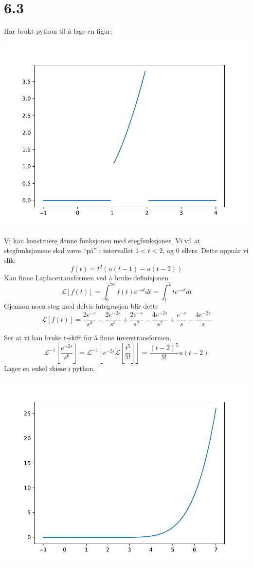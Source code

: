 \documentclass[11pt, a4paper, norsk]{NTNUoving}
\begin{document}
\section*{6.3}
\begin{oppgave}[8]
  Har brukt python til å lage en figur:

  \includegraphics[scale=0.5]{6.2.8.pdf}

  Vi kan konstruere denne funksjonen med stegfunksjoner. Vi vil at stegfunksjonene skal være ``på'' i intervallet $1<t<2$, og 0 ellers. Dette oppnår vi slik:
  \[
    f(t)=t^{2}(u(t-1)-u(t-2))
  \]
  Kan finne Laplacetransformen ved å bruke definisjonen
  \[
    \mathscr{L}[f(t)]=\int_{0}^{\infty}f(t)e^{-st}dt= \int_{1}^{2}te^{-st}dt
  \]
  Gjennon noen steg med delvis integrasjon blir dette
  \[
    \mathscr{L}[f(t)]=\frac{2e^{-s}}{s^{3}}-\frac{2e^{-2s}}{s^{3}}
    +\frac{2e^{-s}}{s^{2}}-\frac{4e^{-2s}}{s^{2}}
    +\frac{e^{-s}}{s}-\frac{4e^{-2s}}{s}
  \]
\end{oppgave}
\begin{oppgave}[15]
  Ser at vi kan bruke t-skift for å finne inverstransformen.
  \[
    \mathscr{L}^{-1}\left[\frac{e^{-2s}}{s^{6}}\right]= \mathscr{L}^{-1}\left[e^{-2s} \mathscr{L}\left[\frac{t^{5}}{5!}\right]\right]=\frac{(t-2)^{5}}{5!}u(t-2)
  \]
  Lager en enkel skisse i python.

  \includegraphics[scale=0.5]{6.3.15.pdf}
\end{oppgave}
\end{document}

